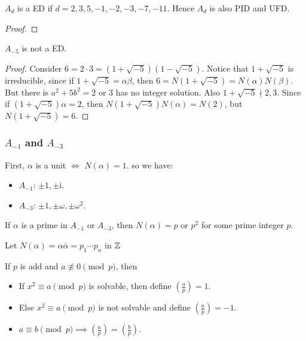 \begin{theorem}
  $A_d$ is a ED if $d = 2, 3, 5, -1, -2, -3, -7, -11$. Hence $A_d$ is also PID and UFD.
  \begin{proof}
  \end{proof}
\end{theorem}

\begin{example}
  $A_{-5}$ is not a ED.

  \begin{proof}
    Consider $6 = 2 \cdot 3 = (1 + \sqrt{-5})(1 - \sqrt{-5})$.
    Notice that $1 + \sqrt{-5}$ is irreducible, since if $1 + \sqrt{-5} = \alpha \beta$,
    then $6 = N(1 + \sqrt{-5}) = N(\alpha) N(\beta)$. But there is
    $a^2 + 5b^2 = 2 \text{ or } 3$ has no integer solution.
    Also $1 + \sqrt{-5} \nmid 2, 3$. Since if $(1 + \sqrt{-5}) \alpha = 2$,
    then $N(1 + \sqrt{-5}) N(\alpha) = N(2)$, but $N(1 + \sqrt{-5}) = 6$.
  \end{proof}
\end{example}

\subsubsection{$A_{-1}$ and $A_{-3}$}
First, $\alpha$ is a unit $\iff$ $N(\alpha) = 1$.
so we have:
\begin{itemize}
  \item $A_{-1}$: $\pm 1, \pm \mathrm{i}$.
  \item $A_{-3}$: $\pm 1, \pm \omega, \pm \omega^2$.
\end{itemize}

If $\alpha$ is a prime in $A_{-1}$ or $A_{-3}$, then $N(\alpha) = p \text{ or } p^2$ for some prime integer $p$.

Let $N(\alpha)  = \alpha \bar\alpha = p_1 \dotsm p_n$ in $\mathbb{Z}$

\begin{definition}
  If $p$ is add and $a \not\equiv 0 \pmod{p}$, then
  \begin{itemize}
    \item If $x^2 \equiv a \pmod{p}$ is solvable, then define $\left( \frac{a}{p} \right) = 1$.
    \item Else $x^2 \equiv a \pmod{p}$ is not solvable and define $\left( \frac{a}{p} \right) = -1$.
  \end{itemize}
\end{definition}

\begin{prop} \hfill
  \begin{itemize}
    \item $a \equiv b \pmod{p} \implies \left( \frac{a}{p} \right) = \left( \frac{b}{p} \right)$.
  \end{itemize}
\end{prop}

